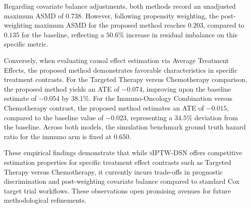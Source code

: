 \documentclass[10pt,twocolumn]{article}
\begin{document}
Regarding covariate balance adjustments, both methods record an unadjusted maximum ASMD of $0.738$. However, following propensity weighting, the post-weighting maximum ASMD for the proposed method reaches $0.203$, compared to $0.135$ for the baseline, reflecting a $50.6\%$ increase in residual imbalance on this specific metric. 

Conversely, when evaluating causal effect estimation via Average Treatment Effects, the proposed method demonstrates favorable characteristics in specific treatment contrasts. For the Targeted Therapy versus Chemotherapy comparison, the proposed method yields an ATE of $-0.074$, improving upon the baseline estimate of $-0.054$ by $38.1\%$. For the Immuno-Oncology Combination versus Chemotherapy contrast, the proposed method estimates an ATE of $-0.015$, compared to the baseline value of $-0.023$, representing a $34.5\%$ deviation from the baseline. Across both models, the simulation benchmark ground truth hazard ratio for the immuno arm is fixed at $0.650$.

These empirical findings demonstrate that while \textsc{sIPTW-DSN} offers competitive estimation properties for specific treatment effect contrasts such as Targeted Therapy versus Chemotherapy, it currently incurs trade-offs in prognostic discrimination and post-weighting covariate balance compared to standard Cox target trial workflows. These observations open promising avenues for future methodological refinements.
\end{document}
